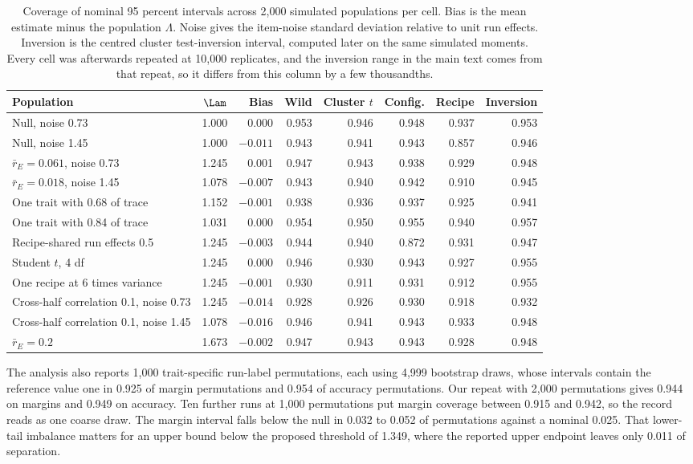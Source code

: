 \begin{table}[!htb]
\centering
\caption{Coverage of nominal 95 percent intervals across 2,000 simulated populations per cell. Bias is the mean estimate minus the population $\Lambda$. Noise gives the item-noise standard deviation relative to unit run effects. Inversion is the centred cluster test-inversion interval, computed later on the same simulated moments. Every cell was afterwards repeated at 10,000 replicates, and the inversion range in the main text comes from that repeat, so it differs from this column by a few thousandths.}
\label{tab:coverage}
\small\setlength{\tabcolsep}{4pt}\renewcommand{\arraystretch}{1.1}
\begin{tabular}{lrrrrrrr}
\toprule
Population & $\Lam$ & Bias & Wild & Cluster $t$ & Config. & Recipe & Inversion\\
\midrule
Null, noise 0.73 & 1.000 & 0.000 & 0.953 & 0.946 & 0.948 & 0.937 & 0.953\\
Null, noise 1.45 & 1.000 & $-0.011$ & 0.943 & 0.941 & 0.943 & 0.857 & 0.946\\
$\bar r_E=0.061$, noise 0.73 & 1.245 & 0.001 & 0.947 & 0.943 & 0.938 & 0.929 & 0.948\\
$\bar r_E=0.018$, noise 1.45 & 1.078 & $-0.007$ & 0.943 & 0.940 & 0.942 & 0.910 & 0.945\\
One trait with 0.68 of trace & 1.152 & $-0.001$ & 0.938 & 0.936 & 0.937 & 0.925 & 0.941\\
One trait with 0.84 of trace & 1.031 & 0.000 & 0.954 & 0.950 & 0.955 & 0.940 & 0.957\\
Recipe-shared run effects 0.5 & 1.245 & $-0.003$ & 0.944 & 0.940 & 0.872 & 0.931 & 0.947\\
Student $t$, 4 df & 1.245 & 0.000 & 0.946 & 0.930 & 0.943 & 0.927 & 0.955\\
One recipe at 6 times variance & 1.245 & $-0.001$ & 0.930 & 0.911 & 0.931 & 0.912 & 0.955\\
Cross-half correlation 0.1, noise 0.73 & 1.245 & $-0.014$ & 0.928 & 0.926 & 0.930 & 0.918 & 0.932\\
Cross-half correlation 0.1, noise 1.45 & 1.078 & $-0.016$ & 0.946 & 0.941 & 0.943 & 0.933 & 0.948\\
$\bar r_E=0.2$ & 1.673 & $-0.002$ & 0.947 & 0.943 & 0.943 & 0.928 & 0.948\\
\bottomrule
\end{tabular}
\end{table}

The analysis also reports 1,000 trait-specific run-label permutations, each using 4,999 bootstrap draws, whose intervals contain the reference value one in 0.925 of margin permutations and 0.954 of accuracy permutations. Our repeat with 2,000 permutations gives 0.944 on margins and 0.949 on accuracy. Ten further runs at 1,000 permutations put margin coverage between 0.915 and 0.942, so the record reads as one coarse draw. The margin interval falls below the null in 0.032 to 0.052 of permutations against a nominal 0.025. That lower-tail imbalance matters for an upper bound below the proposed threshold of 1.349, where the reported upper endpoint leaves only 0.011 of separation.

